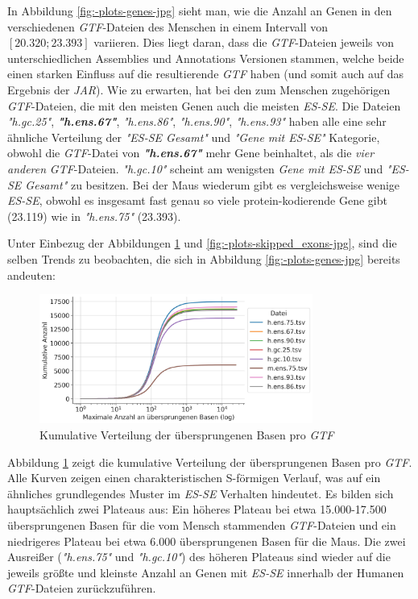 \documentclass[12pt]{article}
\begin{document}
In Abbildung \ref{fig:-plots-genes-jpg} sieht man, wie die Anzahl an Genen in den verschiedenen \textit{GTF}-Dateien des
Menschen in einem Intervall von $[20.320; 23.393]$ variieren. Dies liegt daran, dass die
\textit{GTF}-Dateien jeweils von unterschiedlichen Assemblies und Annotations Versionen stammen,
welche beide einen starken Einfluss auf die resultierende \textit{GTF} haben (und somit auch auf das Ergebnis der \textit{JAR}).
Wie zu erwarten, hat bei den zum Menschen zugehörigen \textit{GTF}-Dateien, die mit den meisten Genen auch die meisten \textit{ES-SE}.
Die Dateien \textit{"h.gc.25"}, \textit{\textbf{"h.ens.67"}}, \textit{"h.ens.86"}, \textit{"h.ens.90"}, \textit{"h.ens.93"} haben alle eine sehr
ähnliche Verteilung der \textit{"ES-SE Gesamt"} und \textit{"Gene mit ES-SE"} Kategorie, obwohl die \textit{GTF}-Datei von
\textit{\textbf{"h.ens.67"}} mehr Gene beinhaltet, als die \textit{vier anderen} \textit{GTF}-Dateien.
\textit{"h.gc.10"} scheint am wenigsten \textit{Gene mit ES-SE} und \textit{"ES-SE Gesamt"} zu besitzen.
Bei der Maus wiederum gibt es vergleichsweise wenige \textit{ES-SE}, obwohl es insgesamt fast genau so viele
protein-kodierende Gene gibt (23.119) wie in \textit{"h.ens.75"} (23.393).

Unter Einbezug der Abbildungen \ref{fig:-plots-skipped_bases-jpg} und \ref{fig:-plots-skipped_exons-jpg}, sind die
selben Trends zu beobachten, die sich in Abbildung \ref{fig:-plots-genes-jpg} bereits andeuten:

\begin{figure}[htpb]
	\centering
	\includegraphics[width=0.8\textwidth]{./plots/skipped_bases.jpg}
	\caption{Kumulative Verteilung der übersprungenen Basen pro \textit{GTF}}
	\label{fig:-plots-skipped_bases-jpg}
\end{figure}


Abbildung \ref{fig:-plots-skipped_bases-jpg} zeigt die kumulative Verteilung der übersprungenen Basen pro \textit{GTF}.
Alle Kurven zeigen einen charakteristischen S-förmigen Verlauf, was auf ein ähnliches grundlegendes Muster im \textit{ES-SE} Verhalten
hindeutet. Es bilden sich hauptsächlich zwei Plateaus aus:
Ein höheres Plateau bei etwa 15.000-17.500 übersprungenen Basen für die vom Mensch stammenden \textit{GTF}-Dateien
und ein niedrigeres Plateau bei etwa 6.000 übersprungenen Basen für die Maus.
Die zwei Ausrei\ss er (\textit{"h.ens.75"} und \textit{"h.gc.10"}) des höheren Plateaus sind wieder auf die jeweils
grö\ss te und kleinste Anzahl an Genen mit \textit{ES-SE} innerhalb der Humanen \textit{GTF}-Dateien zurückzuführen.
\end{document}
